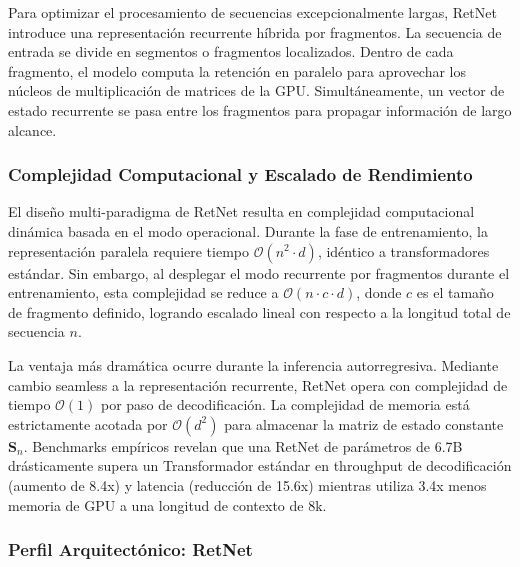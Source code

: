 \documentclass[11pt,a4paper]{article}
\begin{document}
Para optimizar el procesamiento de secuencias excepcionalmente largas, RetNet introduce una representación recurrente híbrida por fragmentos. La secuencia de entrada se divide en segmentos o fragmentos localizados. Dentro de cada fragmento, el modelo computa la retención en paralelo para aprovechar los núcleos de multiplicación de matrices de la GPU. Simultáneamente, un vector de estado recurrente se pasa entre los fragmentos para propagar información de largo alcance.

\subsubsection{Complejidad Computacional y Escalado de Rendimiento}

El diseño multi-paradigma de RetNet resulta en complejidad computacional dinámica basada en el modo operacional. Durante la fase de entrenamiento, la representación paralela requiere tiempo $\mathcal{O}(n^2 \cdot d)$, idéntico a transformadores estándar. Sin embargo, al desplegar el modo recurrente por fragmentos durante el entrenamiento, esta complejidad se reduce a $\mathcal{O}(n \cdot c \cdot d)$, donde $c$ es el tamaño de fragmento definido, logrando escalado lineal con respecto a la longitud total de secuencia $n$.

La ventaja más dramática ocurre durante la inferencia autorregresiva. Mediante cambio seamless a la representación recurrente, RetNet opera con complejidad de tiempo $\mathcal{O}(1)$ por paso de decodificación. La complejidad de memoria está estrictamente acotada por $\mathcal{O}(d^2)$ para almacenar la matriz de estado constante $\mathbf{S}_n$. Benchmarks empíricos revelan que una RetNet de parámetros de 6.7B drásticamente supera un Transformador estándar en throughput de decodificación (aumento de 8.4x) y latencia (reducción de 15.6x) mientras utiliza 3.4x menos memoria de GPU a una longitud de contexto de 8k.

\subsubsection{Perfil Arquitectónico: RetNet}
\end{document}
